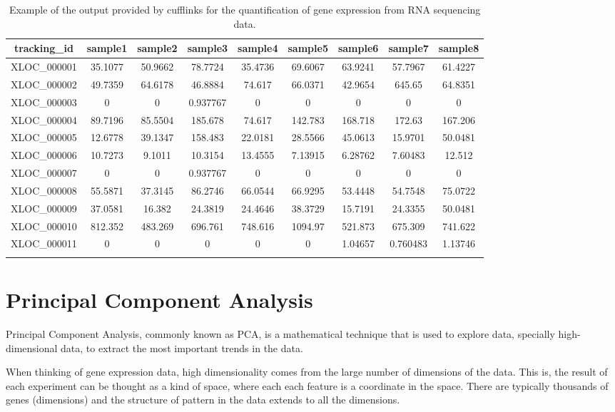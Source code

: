 \documentclass[11pt, oneside]{article}   	%
\begin{document}
\begin{table}[h]
    \centering
    \caption{Example of the output provided by cufflinks for the quantification of gene expression from RNA sequencing data.}
    \begin{tabular}{c|c|c|c|c|c|c|c|c}
    tracking\_id & sample1 & sample2 & sample3 & sample4 & sample5 & sample6 & sample7 & sample8 \\
    \hline
    XLOC\_000001 & 35.1077 & 50.9662 & 78.7724 & 35.4736 & 69.6067 & 63.9241 & 57.7967 & 61.4227 \\
    XLOC\_000002 & 49.7359 & 64.6178 & 46.8884 & 74.617 & 66.0371 & 42.9654 & 645.65 & 64.8351 \\
    XLOC\_000003 & 0 & 0 & 0.937767 & 0 & 0 & 0 & 0 & 0\\
    XLOC\_000004 & 89.7196 & 85.5504 & 185.678 & 74.617 & 142.783 & 168.718 & 172.63 & 167.206 \\
    XLOC\_000005 & 12.6778 & 39.1347 & 158.483 & 22.0181 & 28.5566 & 45.0613 & 15.9701 & 50.0481 \\
    XLOC\_000006 & 10.7273 & 9.1011 & 10.3154 & 13.4555 & 7.13915 & 6.28762 & 7.60483 & 12.512 \\
    XLOC\_000007 & 0 & 0 & 0.937767 & 0 & 0 & 0 & 0 & 0 \\
    XLOC\_000008 & 55.5871 & 37.3145 & 86.2746 & 66.0544 & 66.9295 & 53.4448 & 54.7548 & 75.0722 \\
    XLOC\_000009 & 37.0581 & 16.382 & 24.3819 & 24.4646 & 38.3729 & 15.7191 & 24.3355 & 50.0481 \\
    XLOC\_000010 & 812.352 & 483.269 & 696.761 & 748.616 & 1094.97 & 521.873 & 675.309 & 741.622 \\
    XLOC\_000011 & 0 & 0 & 0 & 0 & 0 & 1.04657 & 0.760483 & 1.13746\\
    \hline
    \label{tab:ExpressionCufflinks}
    \end{tabular}
\end{table}




\section{Principal Component Analysis}

Principal Component Analysis, commonly known as PCA, is a mathematical technique that is used to explore data, specially high-dimensional data, to extract the most important trends in the data.

When thinking of gene expression data, high dimensionality comes from the large number of dimensions of the data. This is, the result of each experiment can be thought as a kind of space, where each each feature is a coordinate in the space. There are typically thousands of genes (dimensions) and the structure of pattern in the data extends to all the dimensions. 
\end{document}
